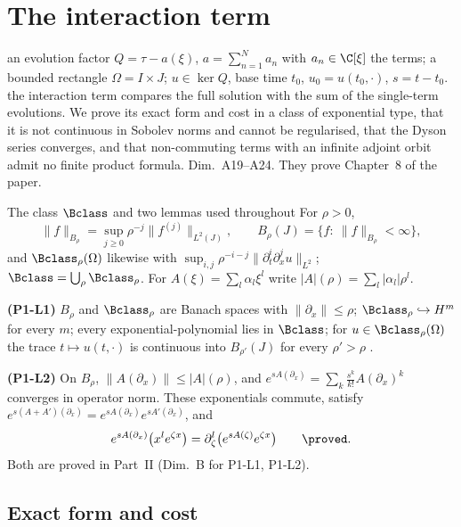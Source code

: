 \chapter{The interaction term}\label{ch:cI3}
\chapterbrief
{an evolution factor $Q=\tau-a(\xi)$, $a=\sum_{n=1}^Na_n$ with $a_n\in\C[\xi]$ the terms; a bounded rectangle $\Omega=I\times J$; $u\in\ker Q$, base time $t_0$, $u_0=u(t_0,\cdot)$, $s=t-t_0$.}
{the interaction term compares the full solution with the sum of the single-term evolutions. We prove its exact form and cost in a class of exponential type, that it is not continuous in Sobolev norms and cannot be regularised, that the Dyson series converges, and that non-commuting terms with an infinite adjoint orbit admit no finite product formula.}
{Dim.~A19--A24. They prove Chapter~8 of the paper.}

\begin{notebox}{The class $\Bclass$ and two lemmas used throughout}
For $\rho>0$,
\[
\|f\|_{B_\rho}=\sup_{j\ge0}\rho^{-j}\|f^{(j)}\|_{L^2(J)},\qquad B_\rho(J)=\{f:\ \|f\|_{B_\rho}<\infty\},
\]
and $\Bclass_\rho(\Omega)$ likewise with $\sup_{i,j}\rho^{-i-j}\|\partial_t^i\partial_x^ju\|_{L^2}$; $\Bclass=\bigcup_\rho\Bclass_\rho$. For $A(\xi)=\sum_l\alpha_l\xi^l$ write $|A|(\rho)=\sum_l|\alpha_l|\rho^l$.

\textbf{(P1-L1)} $B_\rho$ and $\Bclass_\rho$ are Banach spaces with $\|\partial_x\|\le\rho$; $\Bclass_\rho\hookrightarrow H^m$ for every $m$; every exponential-polynomial lies in $\Bclass$; for $u\in\Bclass_\rho(\Omega)$ the trace $t\mapsto u(t,\cdot)$ is continuous into $B_{\rho'}(J)$ for every $\rho'>\rho$ \proved.

\textbf{(P1-L2)} On $B_\rho$, $\|A(\partial_x)\|\le|A|(\rho)$, and $e^{sA(\partial_x)}=\sum_k\frac{s^k}{k!}A(\partial_x)^k$ converges in operator norm. These exponentials commute, satisfy $e^{s(A+A')(\partial_x)}=e^{sA(\partial_x)}e^{sA'(\partial_x)}$, and
\[
e^{sA(\partial_x)}\big(x^le^{\zeta x}\big)=\partial_\zeta^l\big(e^{sA(\zeta)}e^{\zeta x}\big)\qquad\proved .
\]
Both are proved in Part~II (Dim.~B for P1-L1, P1-L2).
\end{notebox}

\section{Exact form and cost}

